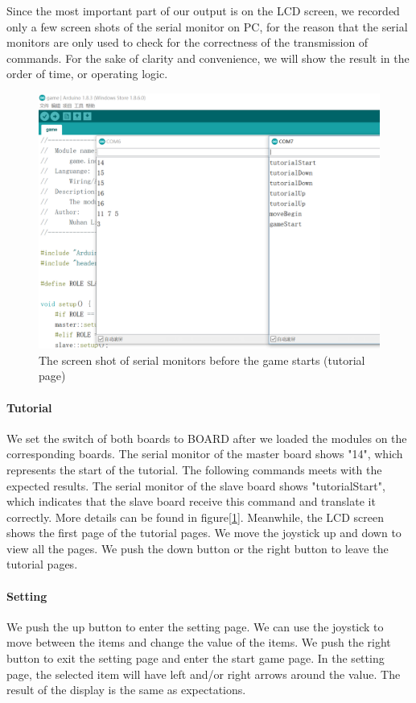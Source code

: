 Since the most important part of our output is on the LCD screen, we recorded only a few screen shots of the serial monitor on PC, for the reason that the serial monitors are only used to check for the correctness of the transmission of commands. For the sake of clarity and convenience, we will show the result in the order of time, or operating logic.
\begin{figure}[!htbp]
	\centering
	\includegraphics{images/serial.png}
	\caption{The screen shot of serial monitors before the game starts (tutorial page)}
	\label{fig:result}
\end{figure}
\paragraph{Tutorial}
We set the switch of both boards to BOARD after we loaded the modules on the corresponding boards. The serial monitor of the master board shows "14", which represents the start of the tutorial. The following commands meets with the expected results. The serial monitor of the slave board shows "tutorialStart", which indicates that the slave board receive this command and translate it correctly. More details can be found in figure[\ref{fig:result}]. Meanwhile, the LCD screen shows the first page of the tutorial pages. We move the joystick up and down to view all the pages. We push the down button or the right button to leave the tutorial pages.
\paragraph{Setting}
We push the up button to enter the setting page. We can use the joystick to move between the items and change the value of the items. We push the right button to exit the setting page and enter the start game page. In the setting page, the selected item will have left and/or right arrows around the value. The result of the display is the same as expectations.
